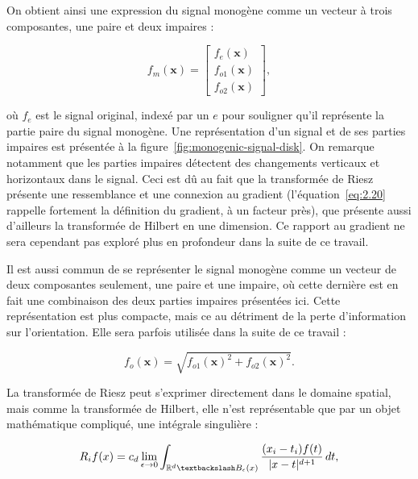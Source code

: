On obtient ainsi une expression du signal monogène comme un vecteur à trois composantes, une paire et deux impaires :

\begin{equation}
    f_m(\mathbf{x}) =
    \left[
        \begin{array}{c}
        f_e(\mathbf{x}) \\
        f_{o1}(\mathbf{x}) \\
        f_{o2}(\mathbf{x})
        \end{array}
    \right],
\end{equation}

où $f_e$ est le signal original, indexé par un $e$ pour souligner qu'il représente la partie paire du signal monogène. Une représentation d'un signal et de ses parties impaires est présentée à la figure~\ref{fig:monogenic-signal-disk}. On remarque notamment que les parties impaires détectent des changements verticaux et horizontaux dans le signal. Ceci est dû au fait que la transformée de Riesz présente une ressemblance et une connexion au gradient (l'équation~\ref{eq:2.20} rappelle fortement la définition du gradient, à un facteur près), que présente aussi d'ailleurs la transformée de Hilbert en une dimension. Ce rapport au gradient ne sera cependant pas exploré plus en profondeur dans la suite de ce travail.

Il est aussi commun de se représenter le signal monogène comme un vecteur de deux composantes seulement, une paire et une impaire, où cette dernière est en fait une combinaison des deux parties impaires présentées ici. Cette représentation est plus compacte, mais ce au détriment de la perte d'information sur l'orientation. Elle sera parfois utilisée dans la suite de ce travail :

\begin{equation}
    f_o(\mathbf{x}) = \sqrt{f_{o1}(\mathbf{x})^2 + f_{o2}(\mathbf{x})^2}.
\end{equation}

La transformée de Riesz peut s'exprimer directement dans le domaine spatial, mais comme la transformée de Hilbert, elle n'est représentable que par un objet mathématique compliqué, une intégrale singulière :

\begin{equation}
    R_if(x) = c_d \lim_{\epsilon \to 0}\int_{\mathbb{R}^d\textbackslash B_\epsilon(x)}\frac{(x_i-t_i)f(t)}{|x-t|^{d+1}}\,dt,
    \label{eq:riesz-transform-spatial}
\end{equation}

